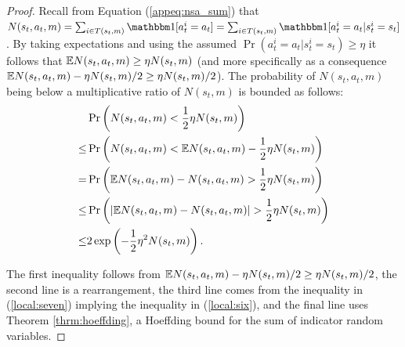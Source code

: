     \begin{proof}
        Recall from Equation (\ref{appeq:nsa_sum}) that $N(s_t,a_t,m)=\sum_{i\in T(s_t,m)} \one[a^i_t=a_t] = \sum_{i\in T(s_t,m)} \one[a^i_t=a_t | s^i_t=s_t]$. By taking expectations and using the assumed $\Pr(a^i_t=a_t|s^i_t=s_t)\geq\eta$ it follows that $\mathbb{E}N(s_t,a_t,m) \geq \eta N(s_t,m)$ (and more specifically as a consequence $\mathbb{E}N(s_t,a_t,m) - \eta N(s_t,m)/2 \geq \eta N(s_t,m)/2$). The probability of $N(s_t,a_t,m)$ being below a multiplicative ratio of $N(s_t,m)$ is bounded as follows:
        \begin{align}
            & \Pr\left(N(s_t,a_t,m) < \frac{1}{2}\eta N(s_t,m)\right) \\
                \leq & \Pr\left(N(s_t,a_t,m) < \mathbb{E}N(s_t,a_t,m) - \frac{1}{2}\eta N(s_t,m)\right) \\
                = & \Pr\left(\mathbb{E}N(s_t,a_t,m) - N(s_t,a_t,m) > \frac{1}{2}\eta N(s_t,m)\right) 
                    \label{local:seven} \\
                \leq & \Pr\left(|\mathbb{E}N(s_t,a_t,m) - N(s_t,a_t,m)| > \frac{1}{2}\eta N(s_t,m)\right) 
                    \label{local:six} \\
                \leq & 2\exp\left(-\frac{1}{2}\eta^2N(s_t,m)\right). \label{eq:bound_nsa}
        \end{align}
        
        The first inequality follows from $\mathbb{E}N(s_t,a_t,m) - \eta N(s_t,m)/2 \geq \eta N(s_t,m)/2$, the second line is a rearrangement, the third line comes from the inequality in (\ref{local:seven}) implying the inequality in (\ref{local:six}), and the final line uses Theorem \ref{thrm:hoeffding}, a Hoeffding bound for the sum of indicator random variables. 
        

\end{proof}
